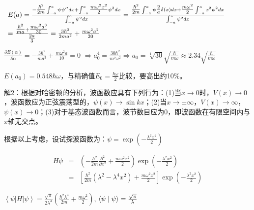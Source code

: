 $\begin{array}{l}
 E(a) = \frac{{ - {\textstyle{{\hbar ^2 } \over {2m}}}\int_{ - a}^a {\psi \psi ''dx}  + \int_{ - a}^a {{\textstyle{{m\omega ^2 x^2 } \over 2}}\psi ^2 dx} }}{{\int_{ - a}^a {\psi ^2 dx} }} = \frac{{{\textstyle{{\hbar ^2 } \over {2m}}}\int_{ - a}^a {\psi {\textstyle{2 \over a}}\delta (x)dx}  + {\textstyle{{m\omega ^2 } \over 2}}\int_{ - a}^a {x^2 \psi ^2 dx} }}{{\int_{ - a}^a {\psi ^2 dx} }} \\
  = \frac{{{\textstyle{{\hbar ^2 } \over {ma}}} + {\textstyle{{m\omega ^2 a^3 } \over {30}}}}}{{{\textstyle{{2a} \over 3}}}} = \frac{{3\hbar ^2 }}{{2ma^2 }} + \frac{{m\omega ^2 a^2 }}{{20}} \\
 \end{array}$


$\frac{{\partial E(\alpha )}}{{\partial \alpha }} =  - \frac{{3\hbar ^2 }}{{ma^3 }} + \frac{{m\omega ^2 a}}{{10}} = 0$
$ \Rightarrow a_0 ^4  = \frac{{30\hbar ^2 }}{{m^2 \omega ^2 }} \Rightarrow a_0  = \sqrt[4]{{30}}\sqrt {\frac{\hbar }{{m\omega }}}  \approx 2.34\sqrt {\frac{\hbar }{{m\omega }}} $

$E(a_0 ) = 0.548\hbar \omega $，与精确值$E_0  = \frac{{\hbar \omega }}{2}$比较，要高出约10$\%$。


解2：根据对哈密顿的分析，波函数应具有下列行为：(1)当$x \to 0$时，$V(x) \to 0$，波函数应为正弦震荡型的，$\psi (x) \to \sin kx$；(2)当$x \to  \pm \infty $，$V(x) \to \infty $，$\psi (x) \to 0$；(3)对于基态波函数而言，波节数目应为0，即波函数在有限空间内与$x$轴无交点。


根据以上考虑，设试探波函数为：$\psi  = \exp \left( { - \frac{{\lambda ^2 x^2 }}{2}} \right)$

\begin{eqnarray*}
H\psi  & = & \left( { - \frac{{\hbar ^2 }}{{2m}}\frac{{\partial ^2 }}{{\partial x^2 }} + \frac{{m\omega ^2 x^2 }}{2}} \right)\exp \left( { - \frac{{\lambda ^2 x^2 }}{2}} \right) \\
{} &=& \left[ {\frac{{\hbar ^2 }}{{2m}}\left( {\lambda ^2  - \lambda ^4 x^2 } \right) + \frac{{m\omega ^2 x^2 }}{2}} \right]\exp \left( { - \frac{{\lambda ^2 x^2 }}{2}} \right)
\end{eqnarray*}

$\left\langle \psi  \right|H\left| \psi  \right\rangle  = \frac{{\sqrt \pi  }}{{2\lambda ^3 }}\left( {\frac{{\hbar ^2 \lambda ^4 }}{{2m}} + \frac{{m\omega ^2 }}{2}} \right)$, $\left\langle {\psi }
 \mathrel{\left | {\vphantom {\psi  \psi }}
 \right. \kern-\nulldelimiterspace}
 {\psi } \right\rangle  = \frac{{\sqrt \pi  }}{\lambda }$


